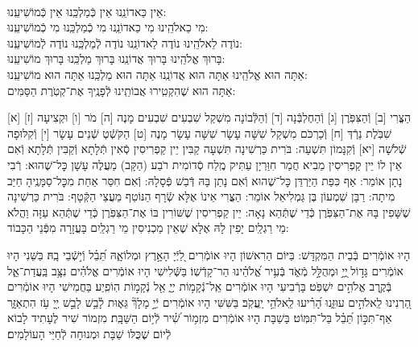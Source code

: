 \documentclass[twoside, openany, parskip=half, 11pt]{book}
\begin{document}
\shabbossimshalom


\tachanunim

\\

\fullkaddish




\label{einkelokeinu}
\hfill אֵין כַּאדוֹנֵֽנוּ \hfill אֵין כְּֿמַלְכֵּֽנוּ \hfill אֵין כְּֿמוֹשִׁיעֵֽנוּ:\\
מִי כֵאלֹהֵֽינוּ \hfill מִי כַאדוֹנֵֽנוּ \hfill מִי כְֿמַלְכֵּֽנוּ \hfill מִי כְֿמוֹשִׁיעֵֽנוּ:\\
נוֹדֶה לֵאלֹהֵֽינוּ \hfill נוֹדֶה לַאדוֹנֵֽנוּ \hfill נוֹדֶה לְֿמַלְכֵּֽנוּ \hfill נוֹדֶה לְֿמוֹשִׁיעֵֽנוּ:\\
בָּרוּךְ אֱלֹהֵֽינוּ \hfill בָּרוּךְ אֲדוֹנֵֽנוּ \hfill בָּרוּךְ מַלְכֵּֽנוּ \hfill בָּרוּךְ מוֹשִׁיעֵֽנוּ:\\
אַתָּה הוּא אֱלֹהֵֽינוּ אַתָּה הוּא אֲדוֹנֵֽנוּ אַתָּה הוּא מַלְכֵּֽנוּ אַתָּה הוּא מוֹשִׁיעֵֽנוּ:\\
אַתָּה הוּא שֶׁהִקְטִֽירוּ אֲבוֹתֵֽינוּ לְֿפָנֶֽיךָ אֶת־קְטֹֽרֶת הַסַּמִּים:

\nextpage

[א] הַצֳּרִי [ב] וְֿהַצִּפֹּֽרֶן [ג] וְֿהַחֶלְבְּֿנָה [ד] וְֿהַלְּֿבוֹנָה מִשְׁקַל שִׁבְעִים שִׁבְעִים מָנֶה [ה] מֹר [ו] וּקְצִיעָה [ז] שִׁבֹּֽלֶת נֵרְֿדְּ [ח] וְֿכַרְכֹּם מִשְׁקַל שִׁשָּׁה עָשָׂר שִׁשָּׁה עָשָׂר מָנֶה [ט] הַקֹּשְֿׁטְ שְֿׁנֵים עָשָׂר [י] וְֿקִלּוּפָה שְֿׁלֹשָׁה [יא] וְֿקִנָּמוֹן תִּשְׁעָה: בֹּרִית כַּרְשִׁינָה תִּשְׁעָה קַבִּין יֵין קַפְרִיסִין סְֿאִין תְּֿלָתָא וְֿקַבִּין תְּֿלָתָא וְֿאִם אֵין לוֹ יֵין קַפְרִיסִין מֵבִיא חֲמַר חִוַּרְיָן עַתִּיק מֶֽלַח סְֿדוֹמִית רֹבַע (הַקָּב) מַעֲלֶה עָשָׁן כׇּל־שֶׁהוּא: רְֿבִי נָתָן אוֹמֵר: אַף כִּפַּת הַיַּרְדֵּן כׇּל־שֶׁהוּא וְֿאִם נָתַן בָּהּ דְּֿבַשׁ פְּֿסָלָהּ: וְֿאִם חִסַּר אַחַת מִכׇּל־סַמָּנֶֽיהָ חַיַּב מִיתָה: רַבָּן שִׁמְעוֹן בֶּן גַּמְלִיאֵל אוֹמֵר: הַצֳּרִי אֵינוֹ אֶלָּא שְֿׂרָף הַנּוֹטֵף מֵעֲצֵי הַקְּֿטָף: בֹּרִית כַּרְשִׁינָה שֶׁשָּׁפִין בָּהּ אֶת־הַצִּפֹּֽרֶן כְּֿדֵי שֶׁתְּֿהֵא נָאָה: יֵין קַפְרִיסִין שֶׁשּׁוֹרִין בּוֹ אֶת־הַצִּפֹּֽרֶן כְּֿדֵי שֶׁתְּֿהֵא עַזָּה וַהֲלֹא מֵי רַגְלַֽיִם יָפִין לָהּ אֶלָּא שֶׁאֵין מַכְנִיסִין מֵי רַגְלַֽיִם בָּעֲזָרָה מִפְּֿנֵי הַכָּבוֹד:

\vspace{-.3\baselineskip}
הָיוּ אוֹמְֿרִים בְּֿבֵית הַמִּקְדָּשׁ:
בַּיּוֹם הַרִאשׁוֹן הָיוּ אוֹמְֿרִים לַ֭יְֿיָ הָאָ֣רֶץ וּמְלוֹאָ֑הּ תֵּ֝בֵ֗ל וְֿי֣שְֿׁבֵי בָֽהּ׃
בַּשֵּׁנִי הָיוּ אוֹמְֿרִים גָּד֣וֹל ֖יְיָ֣ וּמְהֻלָּ֣ל מְֿאֹ֑ד בְּֿעִ֥יר אֱ֝לֹהֵ֗ינוּ הַר־קָדְֿשֽׁוֹ׃
בַּשְּֿׁלִישִׁי הָיוּ אוֹמְֿרִים אֱלֹהִ֗ים נִצָּ֥ב בַּֽעֲדַת־אֵ֑ל בְּֿקֶ֖רֶב אֱלֹהִ֣ים יִשְׁפֹּֽט׃ בָּרְֿבִיעִי הָיוּ אוֹמְֿרִים אֵֽל־נְֿקָמ֥וֹת יְיָ֑ אֵ֖ל נְֿקָמ֣וֹת הֽוֹפִֽיַע׃ בַּחֲמִישִׁי הָיוּ אוֹמְֿרִים הַ֭רְנִינוּ לֵֽאלֹהִ֣ים עוּזֵּ֑נוּ הָ֝רִ֗יעוּ לֵֽאלֹהֵ֥י יַֽעֲקֹֽב׃ בַּשִּׁשִּׁי הָיוּ אוֹמְֿרִים יְֿיָ֣ מָלָךְ֘ גֵּא֢וּת לָ֫בֵ֥שׁ לָבֵ֣שׁ יְ֖יָ עֹ֥ז הִתְאַזָּ֑ר אַף־תִּכּ֣וֹן תֵּ֝בֵ֗ל בַּל־תִּמּֽוֹט׃ בַּשַׁבָּת הָיוּ אוֹמְֿרִים מִזְמ֥וֹר שִׁ֝֗יר לְֿי֥וֹם הַשַּׁבָּֽת׃ מִזְמוֹר שִׁיר לֶעָתִיד לָבוֹא לְֿיוֹם שֶׁכֻּלּוֹ שַׁבָּת וּמְנוּחָה לְֿחַיֵּי הָעוֹלָמִים׃
\end{document}
